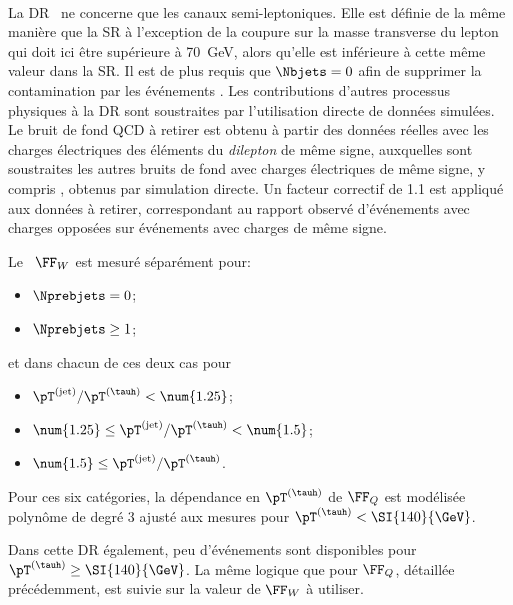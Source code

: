 \paragraph{\Wjets}
La DR \Wjets\ ne concerne que les canaux semi-leptoniques.
Elle est définie de la même manière que la SR à l'exception de la coupure sur la masse transverse du lepton qui doit ici être supérieure à \SI{70}{\GeV}, alors qu'elle est inférieure à cette même valeur dans la SR.
Il est de plus requis que $\Nbjets=0$ afin de supprimer la contamination par les événements \ttbar.
Les contributions d'autres processus physiques à la DR sont soustraites par l'utilisation directe de données simulées.
Le bruit de fond QCD à retirer est obtenu à partir des données réelles avec les charges électriques des éléments du \emph{dilepton} de même signe, auxquelles sont soustraites les autres bruits de fond avec charges électriques de même signe, y compris \Wjets, obtenus par simulation directe.
Un facteur correctif de \num{1.1} est appliqué aux données à retirer, correspondant au rapport observé d'événements avec charges opposées sur événements avec charges de même signe.
\par
Le \fakefactor\ $\FF_W$ est mesuré séparément pour:
\begin{itemize}
\item $\Nprebjets=0$;
\item $\Nprebjets\geq1$;
\end{itemize}
et dans chacun de ces deux cas pour
\begin{itemize}
\item $\pT^{(\text{jet})}/\pT^{(\tauh)} < \num{1.25}$;
\item $\num{1.25} \leq \pT^{(\text{jet})}/\pT^{(\tauh)} < \num{1.5}$;
\item $\num{1.5} \leq \pT^{(\text{jet})}/\pT^{(\tauh)}$.
\end{itemize}
Pour ces six catégories, la dépendance en $\pT^{(\tauh)}$ de $\FF_Q$ est modélisée polynôme de degré 3 ajusté aux mesures pour $\pT^{(\tauh)}<\SI{140}{\GeV}$.
\par
Dans cette DR également, peu d'événements sont disponibles pour $\pT^{(\tauh)}\geq\SI{140}{\GeV}$.
La même logique que pour $\FF_Q$, détaillée précédemment, est suivie sur la valeur de $\FF_W$ à utiliser.
